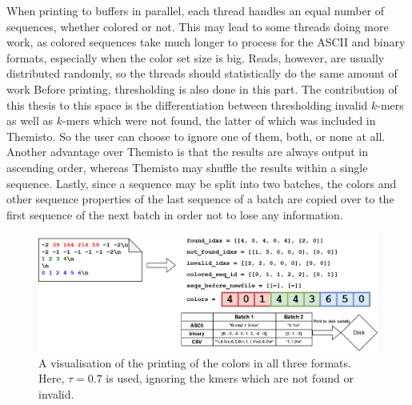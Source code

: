 When printing to buffers in parallel, each thread handles an equal number of sequences, whether colored or not.
This may lead to some threads doing more work, as colored sequences take much longer to process for the ASCII and binary formats, especially when the color set size is big.
Reads, however, are usually distributed randomly, so the threads should statistically do the same amount of work
Before printing, thresholding is also done in this part.
The contribution of this thesis to this space is the differentiation between thresholding invalid $k$-mers as well as $k$-mers which were not found, the latter of which was included in Themisto.
So the user can choose to ignore one of them, both, or none at all.
Another advantage over Themisto is that the results are always output in ascending order, whereas Themisto may shuffle the results within a single sequence.
Lastly, since a sequence may be split into two batches, the colors and other sequence properties of the last sequence of a batch are copied over to the first sequence of the next batch in order not to lose any information.

\begin{figure}[t]
  \centering
  \includegraphics[width=\textwidth]{images/ColorsPrinting.png}
  \caption{A visualisation of the printing of the colors in all three formats. Here, $\tau=0.7$ is used, ignoring the kmers which are not found or invalid.}\label{fig:ColorsPrinting}
\end{figure}
